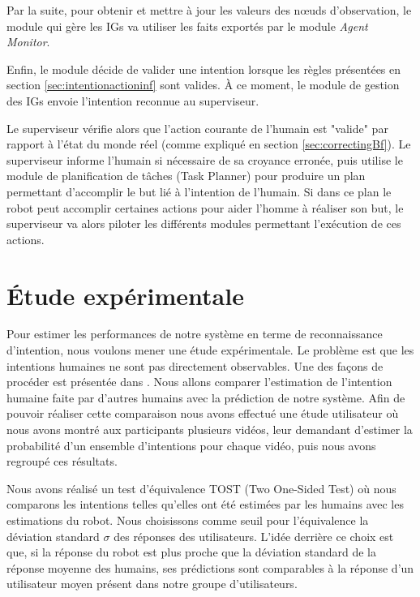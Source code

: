 \documentclass[a4paper,11pt,twoside]{StyleThese}
\begin{document}
Par la suite, pour obtenir et mettre à jour les valeurs des nœuds d'observation, le module qui gère les IGs va utiliser les faits exportés par le module \textit{Agent Monitor}.

Enfin, le module décide de valider une intention lorsque les règles présentées en section \ref{sec:intentionactioninf} sont valides. À ce moment, le module de gestion des IGs envoie l'intention reconnue au superviseur.

Le superviseur vérifie alors que l'action courante de l'humain est "valide" par rapport à l'état du monde réel (comme expliqué en section \ref{sec:correctingBf}).
Le superviseur informe l'humain si nécessaire de sa croyance erronée, puis utilise le module de planification de tâches (Task Planner) pour produire un plan permettant d'accomplir le but lié à l'intention de l'humain.
Si dans ce plan le robot peut accomplir certaines actions pour aider l'homme à réaliser son but, le superviseur va alors piloter les différents modules permettant l'exécution de ces actions.





\section{Étude expérimentale}
\label{sec:experimentsIntent}
Pour estimer les performances de notre système en terme de reconnaissance d'intention, nous voulons mener une étude expérimentale. Le problème est que les intentions humaines ne sont pas directement observables. Une des façons de procéder est présentée dans \cite{baker2014modeling}. Nous allons comparer l'estimation de l'intention humaine faite par d'autres humains avec la prédiction de notre système. Afin de pouvoir réaliser cette comparaison nous avons effectué une étude utilisateur où nous avons montré aux participants plusieurs vidéos, leur demandant d'estimer la probabilité d'un ensemble d'intentions pour chaque vidéo, puis nous avons regroupé ces résultats.

Nous avons réalisé un test d'équivalence TOST (Two One-Sided Test) où nous comparons les intentions telles qu'elles ont été estimées par les humains avec les estimations du robot. Nous choisissons comme seuil pour l'équivalence la déviation standard $\sigma$ des réponses des utilisateurs. L'idée derrière ce choix est que, si la réponse du robot est plus proche que la déviation standard de la réponse moyenne des humains, ses prédictions sont comparables à la réponse d'un utilisateur moyen présent dans notre groupe d'utilisateurs. 
\end{document}
